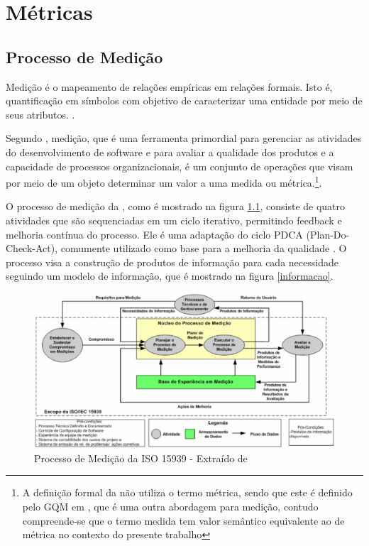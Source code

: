 \chapter{Métricas}

\section{Processo de Medição}

	Medição é o mapeamento de relações empíricas em relações formais. Isto é, quantificação em símbolos com objetivo de caracterizar uma entidade por meio de seus atributos. \cite{Fenton98}.
	
	Segundo , medição, que é uma ferramenta primordial para gerenciar as atividades do desenvolvimento de software e para avaliar a qualidade dos produtos e a capacidade de processos organizacionais,  é um conjunto de operações que visam por meio de um objeto determinar um valor a uma medida ou métrica.\footnote{A definição formal da  não utiliza o termo métrica, sendo que este é definido pelo GQM em , que é uma outra abordagem para medição, contudo compreende-se que o termo medida tem valor semântico equivalente ao de métrica no contexto do presente trabalho}. 
	
	
	O processo de medição da , como é mostrado na figura \ref{processo}, consiste  de quatro atividades que são sequenciadas em um ciclo iterativo, permitindo
	feedback e melhoria contínua do processo. Ele é uma adaptação do ciclo PDCA (Plan-Do-Check-Act), comumente utilizado como base para a melhoria da qualidade \cite{Barcellos2010}.  O processo visa a construção de produtos de informação para cada necessidade seguindo um modelo de informação, que é mostrado na figura \ref{informacao}.
		
		\begin{figure}[h]
		\centering
		
			\includegraphics[keepaspectratio=true,scale=0.6]{figuras/processodemedicao15939.eps}
		\caption{Processo de Medição da ISO 15939 - Extraído de \cite{Gava2006}}
		\label{processo}
	\end{figure}
		

